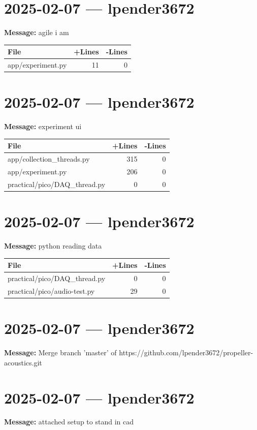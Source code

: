 \documentclass{article}
\begin{document}
\section*{2025-02-07 --- lpender3672}
\textbf{Message:} agile i am

\begin{longtable}{|p{10cm}|r|r|}
\hline \textbf{File} & \textbf{+Lines} & \textbf{-Lines} \\
\hline
app/experiment.py & 11 & 0 \\
\hline
\end{longtable}

\section*{2025-02-07 --- lpender3672}
\textbf{Message:} experiment ui

\begin{longtable}{|p{10cm}|r|r|}
\hline \textbf{File} & \textbf{+Lines} & \textbf{-Lines} \\
\hline
app/collection\_threads.py & 315 & 0 \\
\hline
app/experiment.py & 206 & 0 \\
\hline
practical/pico/DAQ\_thread.py & 0 & 0 \\
\hline
\end{longtable}

\section*{2025-02-07 --- lpender3672}
\textbf{Message:} python reading data

\begin{longtable}{|p{10cm}|r|r|}
\hline \textbf{File} & \textbf{+Lines} & \textbf{-Lines} \\
\hline
practical/pico/DAQ\_thread.py & 0 & 0 \\
\hline
practical/pico/audio-test.py & 29 & 0 \\
\hline
\end{longtable}

\section*{2025-02-07 --- lpender3672}
\textbf{Message:} Merge branch 'master' of https://github.com/lpender3672/propeller-acoustics.git

\section*{2025-02-07 --- lpender3672}
\textbf{Message:} attached setup to stand in cad
\end{document}
